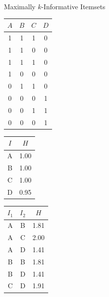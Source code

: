 \documentclass[12pt]{beamer}
\theoremstyle{break}
\begin{document}
\begin{frame}{Maximally $k$-Informative Itemsets}

	\begin{table}
	\centering
    \begin{minipage}{.3\textwidth}
        \centering
        \begin{tabular}{c c c c}
            \toprule
            $A$ & $B$ & $C$ & $D$ \\
            \midrule
            1 & 1 & 1 & 0 \\
            1 & 1 & 0 & 0 \\
            1 & 1 & 1 & 0 \\ 
            1 & 0 & 0 & 0 \\
            0 & 1 & 1 & 0 \\
            0 & 0 & 0 & 1 \\
            0 & 0 & 1 & 1 \\
            0 & 0 & 0 & 1 \\
            \bottomrule
        \end{tabular}
    \end{minipage}%
    \begin{minipage}{.3\textwidth}
        \centering
        \begin{tabular}{c c}
            \toprule
            $I$ & $H$ \\
            \midrule
            A & 1.00 \\
            B & 1.00 \\
            C & 1.00 \\
            D & 0.95 \\
            \bottomrule
        \end{tabular}
    \end{minipage}%
    \begin{minipage}{.3\textwidth}
        \centering
        \begin{tabular}{c c c}
            \toprule
            $I_{1}$ & $I_{2}$ & $H$ \\
            \midrule
            A & B & 1.81 \\
            A & C & 2.00 \\
            A & D & 1.41 \\
            B & B & 1.81 \\
            B & D & 1.41 \\
            C & D & 1.91 \\
            \bottomrule
        \end{tabular}
    \end{minipage}
\end{table}
	
\end{frame}
\end{document}
